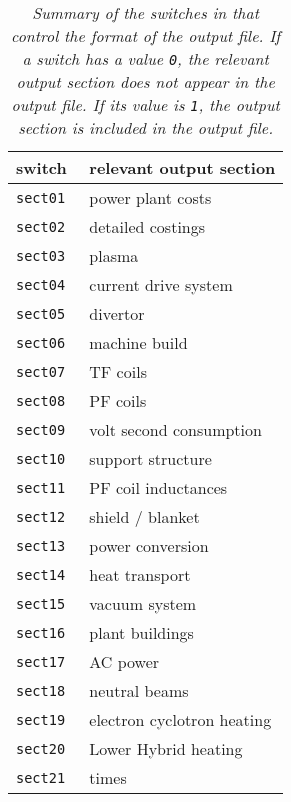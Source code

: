 
\begin{table}[ht]
\begin{center}

\begin{tabular}{||l|l||} \hline
switch      & relevant output section    \\ \hline
\tt sect01  & power plant   costs        \\
\tt sect02  & detailed costings          \\
\tt sect03  & plasma                     \\
\tt sect04  & current drive system       \\
\tt sect05  & divertor                   \\
\tt sect06  & machine build              \\
\tt sect07  & TF coils                   \\
\tt sect08  & PF coils                   \\
\tt sect09  & volt second consumption    \\
\tt sect10  & support structure          \\
\tt sect11  & PF coil inductances        \\
\tt sect12  & shield / blanket           \\
\tt sect13  & power conversion           \\
\tt sect14  & heat transport             \\
\tt sect15  & vacuum system              \\
\tt sect16  & plant buildings            \\
\tt sect17  & AC power                   \\
\tt sect18  & neutral beams              \\
\tt sect19  & electron cyclotron heating \\
\tt sect20  & Lower Hybrid heating       \\ 
\tt sect21  & times                      \\ \hline
\end{tabular}
\end{center}
\caption[TABLE_OSECT]{{\it
Summary of the switches in \PS that control the format of the output
file. If a switch has a value {\tt 0}, the relevant output section
does not appear in the output file. If its value is {\tt 1}, the
output section is included in the output file.
}}
\label{tab:osections}
\end{table}
